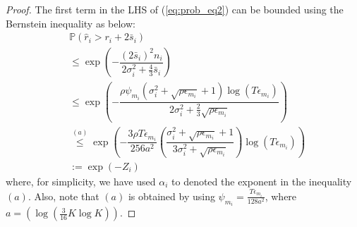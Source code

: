 \begin{proof}
The first term in the LHS of (\ref{eq:prob_eq2}) can be bounded using the Bernstein inequality as below:
\begin{align}
&\mathbb{P}\left( \hat{r}_{i} > r_{i}+ 2\bar{s}_i\right)\nonumber \\
&\le \exp\left(- \dfrac{(2\bar{s}_i)^2 n_i}{2\sigma_i^2+\frac{4}{3}\bar{s}_i}\right)\nonumber \\
& \le \exp\left(- \dfrac{\rho\psi_{m_i} (\sigma_{i}^{2}+\sqrt{\rho\epsilon_{m_{i}}} + 1)\log( T\epsilon_{m_{i}})}{2\sigma_i^2+\frac{2}{3}\sqrt{\rho \epsilon_{m_{i}}}}\right)\nonumber \\
& \overset{(a)}{\leq} \exp\left(- \dfrac{3\rho T\epsilon_{m_i}}{256 a^2} \left(\dfrac{\sigma_{i}^{2}+\sqrt{\rho\epsilon_{m_{i}}}+1}{3\sigma_{i}^{2}+\sqrt{\rho \epsilon_{m_{i}}}}\right) \log( T\epsilon_{m_{i}}) \right) \nonumber \\
&:= \exp(-Z_i) 
\label{tbandit:lhs1_equn}
\end{align}
where, for simplicity, we have used $\alpha_i$ to denoted the exponent in the inequality $(a)$.
Also, note that $(a)$ is obtained by using  $\psi_{m_i}=\frac{T\epsilon_{m_i}}{128a^{2}}$, where $a=(\log(\frac{3}{16} K\log K))$.

\end{proof}

